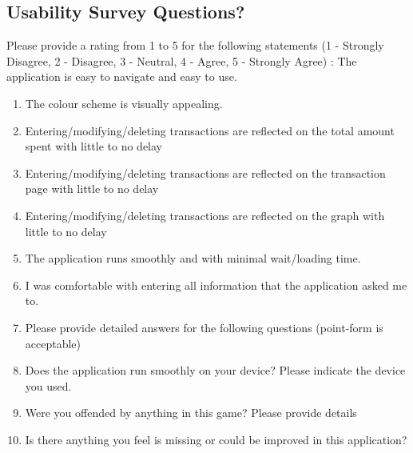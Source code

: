 \documentclass[12pt, titlepage]{article}
\begin{document}
\subsection{Usability Survey Questions?}  \label{aurvey}
Please provide a rating from 1 to 5 for the following statements (1 - Strongly Disagree, 2 - Disagree, 3 - Neutral, 4 - Agree, 5 - Strongly Agree) : 
The application is easy to navigate and easy to use.
\begin{enumerate}

\item The colour scheme is visually appealing.\label{question:q1}
\item Entering/modifying/deleting transactions are reflected on the total amount spent with little to no delay\label{question:q2}
\item Entering/modifying/deleting transactions are reflected on the transaction page with little to no delay\label{question:q3}
\item Entering/modifying/deleting transactions are reflected on the graph with little to no delay\label{question:q4}
\item The application runs smoothly and with minimal wait/loading time.\label{question:q5}
\item I was comfortable with entering all information that the application asked me to.\label{question:q6}
\item Please provide detailed answers for the following questions (point-form is acceptable)\label{question:q7}
\item Does the application run smoothly on your device? Please indicate the device you used.\label{question:q8}
\item Were you offended by anything in this game? Please provide details\label{question:q9}
\item Is there anything you feel is missing or could be improved in this application?\label{question:q10}
\end{enumerate}
\end{document}
